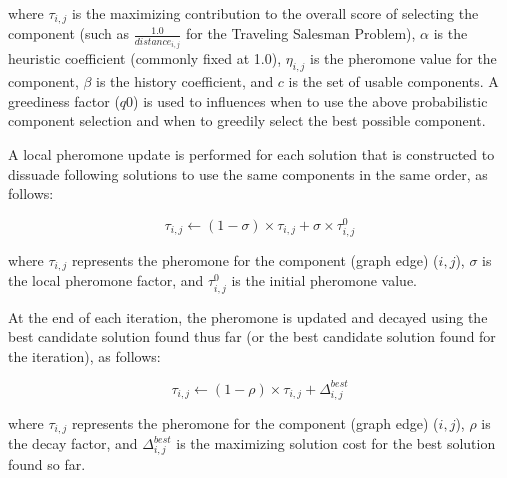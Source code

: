 where $\tau_{i,j}$ is the maximizing contribution to the overall score of selecting the component (such as $\frac{1.0}{distance_{i,j}}$ for the Traveling Salesman Problem), $\alpha$ is the heuristic coefficient (commonly fixed at 1.0), $\eta_{i,j}$ is the pheromone value for the component, $\beta$ is the history coefficient, and $c$ is the set of usable components. A greediness factor ($q0$) is used to influences when to use the above probabilistic component selection and when to greedily select the best possible component. 

A local pheromone update is performed for each solution that is constructed to dissuade following solutions to use the same components in the same order, as follows:

\begin{equation}
\tau_{i,j} \leftarrow (1-\sigma) \times \tau_{i,j} + \sigma \times \tau_{i,j}^{0}
\end{equation}

where $\tau_{i,j}$ represents the pheromone for the component (graph edge) ($i,j$), $\sigma$ is the local pheromone factor, and $\tau_{i,j}^{0}$ is the initial pheromone value.

At the end of each iteration, the pheromone is updated and decayed using the best candidate solution found thus far (or the best candidate solution found for the iteration), as follows:

\begin{equation}
\tau_{i,j} \leftarrow (1-\rho) \times \tau_{i,j} + \Delta_{i,j}^{best}
\end{equation}

where $\tau_{i,j}$ represents the pheromone for the component (graph edge) ($i,j$), $\rho$ is the decay factor, and $\Delta_{i,j}^{best} $ is the maximizing solution cost for the best solution found so far. 



